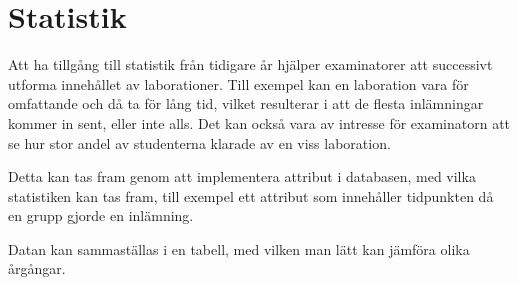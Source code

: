 \section{Statistik}

Att ha tillgång till statistik från tidigare år hjälper examinatorer att successivt utforma innehållet av laborationer. Till exempel kan en laboration vara för omfattande och då ta för lång tid, vilket resulterar i att de flesta inlämningar kommer in sent, eller inte alls. Det kan också vara av intresse för examinatorn att se hur stor andel av studenterna klarade av en viss laboration.  

Detta kan tas fram genom att implementera attribut i databasen, med vilka statistiken kan tas fram, till exempel ett attribut som innehåller tidpunkten då en grupp gjorde en inlämning.

Datan kan sammaställas i en tabell, med vilken man lätt kan jämföra olika årgångar.
